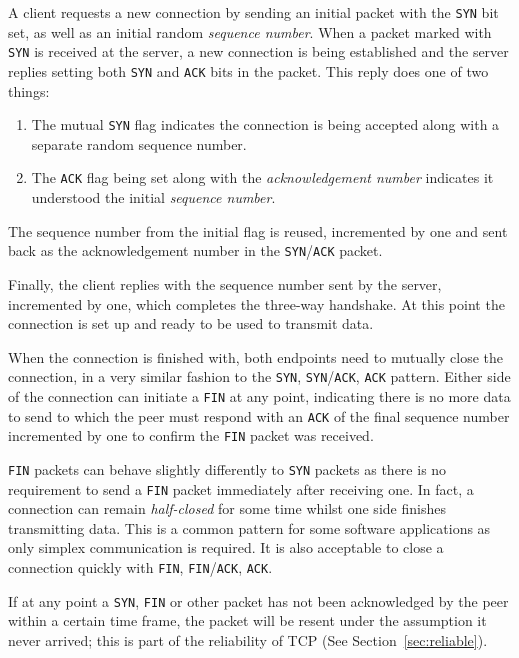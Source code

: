         A client requests a new connection by sending an initial packet with the \texttt{SYN} bit set, as well as an initial random \textit{sequence number}. When a packet marked with \texttt{SYN} is received at the server, a new connection is being established and the server replies setting both \texttt{SYN} and \texttt{ACK} bits in the packet. This reply does one of two things:
        \begin{enumerate}
            \item The mutual \texttt{SYN} flag indicates the connection is being accepted along with a separate random sequence number.
            \item The \texttt{ACK} flag being set along with the \textit{acknowledgement number} indicates it understood the initial \textit{sequence number}.
        \end{enumerate}
        The sequence number from the initial flag is reused, incremented by one and sent back as the acknowledgement number in the \texttt{SYN}/\texttt{ACK} packet.

        Finally, the client replies with the sequence number sent by the server, incremented by one, which completes the three-way handshake. At this point the connection is set up and ready to be used to transmit data.

        When the connection is finished with, both endpoints need to mutually close the connection, in a very similar fashion to the \texttt{SYN}, \texttt{SYN}/\texttt{ACK}, \texttt{ACK} pattern.
        Either side of the connection can initiate a \texttt{FIN} at any point, indicating there is no more data to send to which the peer must respond with an \texttt{ACK} of the final sequence number incremented by one to confirm the \texttt{FIN} packet was received.

        \texttt{FIN} packets can behave slightly differently to \texttt{SYN} packets as there is no requirement to send a \texttt{FIN} packet immediately after receiving one. In fact, a connection can remain \textit{half-closed} for some time whilst one side finishes transmitting data. This is a common pattern for some software applications as only \gls{simplex} communication is required. It is also acceptable to close a connection quickly with \texttt{FIN}, \texttt{FIN}/\texttt{ACK}, \texttt{ACK}.

        If at any point a \texttt{SYN}, \texttt{FIN} or other packet has not been acknowledged by the peer within a certain time frame, the packet will be resent under the assumption it never arrived; this is part of the reliability of \gls{TCP} (See Section~\ref{sec:reliable}).

